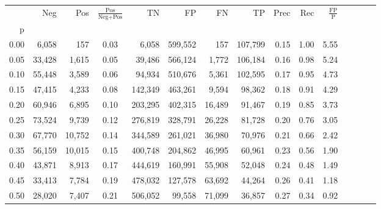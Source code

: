 \begin{tabular}{rrrcrrrrrrrrrrr}
\toprule
{} &     Neg &     Pos & $\frac{\text{Pos}}{\text{Neg}+\text{Pos}}$ &       TN &       FP &       FN &       TP &  Prec &   Rec & $\frac{\text{FP}}{\text{P}}$ \\
p    &         &         &                                            &          &          &          &          &       &       &                              \\
\midrule
0.00 &   6,058 &     157 &                                       0.03 &    6,058 &  599,552 &      157 &  107,799 &  0.15 &  1.00 &                         5.55 \\
0.05 &  33,428 &   1,615 &                                       0.05 &   39,486 &  566,124 &    1,772 &  106,184 &  0.16 &  0.98 &                         5.24 \\
0.10 &  55,448 &   3,589 &                                       0.06 &   94,934 &  510,676 &    5,361 &  102,595 &  0.17 &  0.95 &                         4.73 \\
0.15 &  47,415 &   4,233 &                                       0.08 &  142,349 &  463,261 &    9,594 &   98,362 &  0.18 &  0.91 &                         4.29 \\
0.20 &  60,946 &   6,895 &                                       0.10 &  203,295 &  402,315 &   16,489 &   91,467 &  0.19 &  0.85 &                         3.73 \\
0.25 &  73,524 &   9,739 &                                       0.12 &  276,819 &  328,791 &   26,228 &   81,728 &  0.20 &  0.76 &                         3.05 \\
0.30 &  67,770 &  10,752 &                                       0.14 &  344,589 &  261,021 &   36,980 &   70,976 &  0.21 &  0.66 &                         2.42 \\
0.35 &  56,159 &  10,015 &                                       0.15 &  400,748 &  204,862 &   46,995 &   60,961 &  0.23 &  0.56 &                         1.90 \\
0.40 &  43,871 &   8,913 &                                       0.17 &  444,619 &  160,991 &   55,908 &   52,048 &  0.24 &  0.48 &                         1.49 \\
0.45 &  33,413 &   7,784 &                                       0.19 &  478,032 &  127,578 &   63,692 &   44,264 &  0.26 &  0.41 &                         1.18 \\
0.50 &  28,020 &   7,407 &                                       0.21 &  506,052 &   99,558 &   71,099 &   36,857 &  0.27 &  0.34 &                         0.92 \\

\end{tabular}
